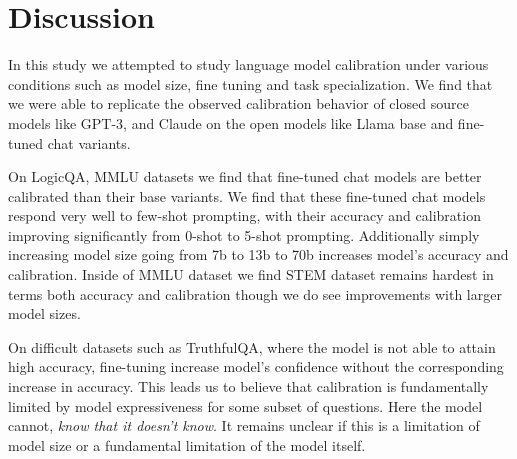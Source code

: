 \documentclass[11pt]{article}
\begin{document}
\section{Discussion}



In this study we attempted to study language model calibration  under various 
conditions such as model size, fine tuning and task specialization. We find that 
we were able to replicate the observed  calibration behavior of closed source models like 
GPT-3, and  Claude on the open models like Llama base and fine-tuned chat variants. 

On LogicQA, MMLU datasets we find that fine-tuned chat models are better calibrated than their base variants.
We find that these fine-tuned chat models respond very well to few-shot prompting, with their accuracy and calibration improving significantly from 0-shot to 5-shot prompting. Additionally simply increasing 
model size going from 7b to 13b to 70b increases model's accuracy and calibration. Inside of MMLU dataset we find  STEM dataset remains hardest in terms both accuracy and calibration though we do see improvements with larger model sizes.

On difficult datasets such as TruthfulQA, where the 
model is not able to attain high accuracy, fine-tuning 
increase model's confidence without the corresponding 
increase in accuracy. This leads us to believe that 
calibration is fundamentally limited by model 
expressiveness for some subset of questions. Here 
the model cannot, \emph{know that it doesn't know}. It remains unclear if this is a limitation of model size or a fundamental limitation of the model itself.  
\end{document}
